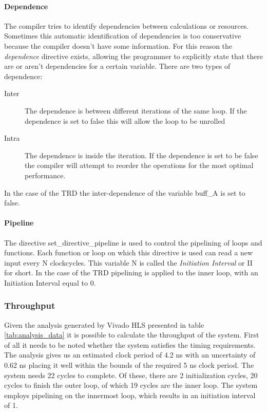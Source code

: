 \documentclass[../thesis.tex]{subfiles}
\begin{document}
\paragraph{Dependence} The compiler tries to identify dependencies between calculations or resources. Sometimes this automatic identification of dependencies is too conservative because the compiler doesn't have some information. For this reason the \emph{dependence} directive exists, allowing the programmer to explicitly state that there are or aren't dependencies for a certain variable. There are two types of dependence:

\begin{description}
\item[Inter] The dependence is between different iterations of the same loop. If the dependence is set to false this will allow the loop to be unrolled
\item[Intra] The dependence is inside the iteration. If the dependence is set to be false the compiler will attempt to reorder the operations for the most optimal performance.
\end{description}

In the case of the TRD the inter-dependence of the variable buff\_A is set to false.

\paragraph{Pipeline} The directive set\_directive\_pipeline is used to control the pipelining of loops and functions. Each function or loop on which this directive is used can read a new input every N clockcycles. This variable N is called the \emph{Initiation Interval} or II for short. In the case of the TRD pipelining is applied to the inner loop, with an Initiation Interval equal to 0.


\subsubsection{Throughput}
\label{sec:original_througput}

Given the analysis generated by Vivado HLS presented in table \ref{tab:analysis_data} it is possible to calculate the throughput of the system. First of all it needs to be noted whether the system satisfies the timing requirements. The analysis gives us an estimated clock period of 4.2 ns with an uncertainty of 0.62 ns placing it well within the bounds of the required 5 ns clock period.
The system needs 22 cycles to complete. Of these, there are 2 initialization cycles, 20 cycles to finish the outer loop, of which 19 cycles are the inner loop. The system employs pipelining on the innermost loop, which results in an initiation interval of 1.
\end{document}
